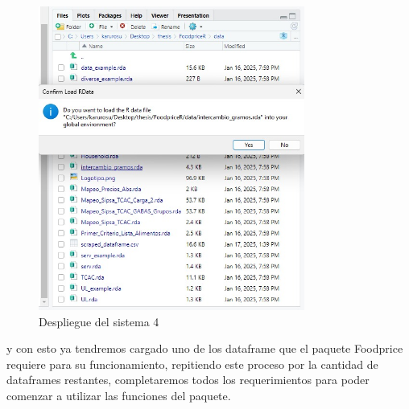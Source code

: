 \begin{figure}[H]
    \centering
    \includegraphics[height=10cm]{img/despliegue/despliegue.jpeg}
    \caption{Despliegue del sistema 4}
    \label{fig:despliegue4}
\end{figure}

y con esto ya tendremos cargado uno de los dataframe que el paquete Foodprice requiere para su funcionamiento, repitiendo este proceso por la cantidad de dataframes restantes, completaremos todos los requerimientos para poder comenzar a utilizar las funciones del paquete.